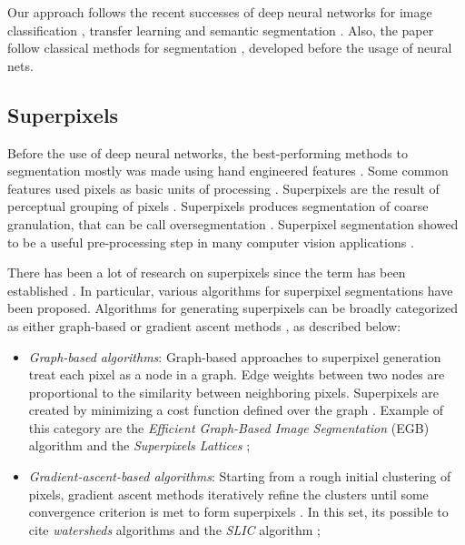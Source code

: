 \documentclass[10pt,twocolumn,letterpaper]{article}
\begin{document}
Our approach follows the recent successes of deep neural networks for image classification \cite{VGGNET} \cite{AHMED_SARMA}, transfer learning \cite{PRATT} \cite{WEISS2016} and semantic segmentation \cite{SEGNET} \cite{UNET} \cite{FULLY_CONVOLU}. Also, the paper follow classical methods for segmentation \cite{WATERSHEDS} \cite{SLIC} \cite{LATTICES} \cite{FELZENSZWALB}, developed before the usage of neural nets.

\subsection{Superpixels} \label{ssec:superpixels}

Before the use of deep neural networks, the best-performing methods to segmentation mostly was made using hand engineered features \cite{SEGNET}. Some common features used pixels as basic units of processing \cite{WANG201728}. Superpixels are the result of perceptual grouping of pixels \cite{WANG201728}. Superpixels produces segmentation of coarse granulation, that can be call oversegmentation \cite{WANG201728}. Superpixel segmentation showed to be a useful pre-processing step in many computer vision applications \cite{WANG201728}.

There has been a lot of research on superpixels since the term has been established \cite{WANG201728}. In particular, various algorithms for superpixel segmentations have been proposed. Algorithms for generating superpixels can be broadly categorized as either graph-based or gradient ascent methods \cite{SLIC}, as described below:

\begin{itemize}
 \item \textit{Graph-based algorithms}: Graph-based approaches to superpixel generation treat each pixel as a node in a graph. Edge weights between two nodes are proportional to the similarity between neighboring pixels. Superpixels are created by minimizing a cost function defined over the graph \cite{SLIC}. Example of this category are the \textit{Efficient Graph-Based Image Segmentation} (EGB) algorithm \cite{FELZENSZWALB} and the \textit{Superpixels Lattices} \cite{LATTICES};
 \item \textit{Gradient-ascent-based algorithms}: Starting from a rough initial clustering of pixels, gradient ascent methods iteratively refine the clusters until some convergence criterion is met to form superpixels \cite{SLIC}. In this set, its possible to cite \textit{watersheds} algorithms \cite{WATERSHEDS} and the \textit{SLIC} algorithm \cite{SLIC};
\end{itemize}
\end{document}

